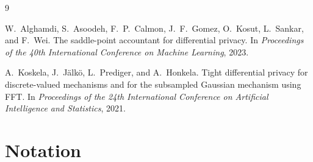 \documentclass[11pt]{article}
\theoremstyle{remark}
\begin{document}
\begin{thebibliography}{9}

W.~Alghamdi, S.~Asoodeh, F.~P.~Calmon, J.~F.~Gomez, O.~Kosut, L.~Sankar,
and F.~Wei.
\newblock The saddle-point accountant for differential privacy.
\newblock In \emph{Proceedings of the 40th International Conference on
Machine Learning}, 2023.

A.~Koskela, J.~J\"alk\"o, L.~Prediger, and A.~Honkela.
\newblock Tight differential privacy for discrete-valued mechanisms and for
the subsampled Gaussian mechanism using FFT.
\newblock In \emph{Proceedings of the 24th International Conference on
Artificial Intelligence and Statistics}, 2021.

\end{thebibliography}

\appendix
\section{Notation}
\end{document}
